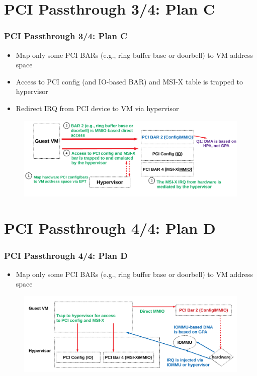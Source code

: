 \documentclass[aspectratio=169]{beamer}
\begin{document}
\section{PCI Passthrough 3/4: Plan C}
\begin{frame}
\frametitle{PCI Passthrough 3/4: Plan C}
\begin{itemize}
\item Map only some PCI BARs (e.g., ring buffer base or doorbell) to VM address space
\item Access to PCI config (and IO-based BAR) and MSI-X table is trapped to hypervisor
\item Redirect IRQ from PCI device to VM via hypervisor
\end{itemize}
\begin{figure}
\includegraphics[width=1.0\linewidth]{figures/plan_c.pdf}
\end{figure}
\end{frame}


\section{PCI Passthrough 4/4: Plan D}
\begin{frame}
\frametitle{PCI Passthrough 4/4: Plan D}
\begin{itemize}
\item Map only some PCI BARs (e.g., ring buffer base or doorbell) to VM address space
\end{itemize}
\begin{figure}
\includegraphics[width=1.0\linewidth]{figures/plan_d.pdf}
\end{figure}
\end{frame}
\end{document}
